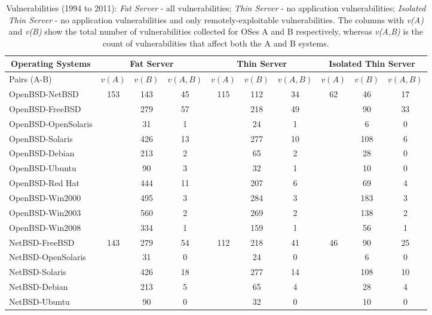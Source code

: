 \begin{table*}[!ht]
\caption{Vulnerabilities (1994 to 2011): \emph{Fat Server} - all vulnerabilities; \emph{Thin Server} - no application vulnerabilities; \emph{Isolated Thin Server} - no application vulnerabilities and only remotely-exploitable vulnerabilities. The columns with \textit{v(A)} and \textit{v(B)} show the total number of vulnerabilities collected for OSes A and B respectively, whereas \textit{v(A,B)} is the count of vulnerabilities that affect both the A and B systems.}
\label{tab:vulns}
\begin{center}
{\scriptsize
\begin{tabular}{|l|| c c c| c c c| c c c| }%

 \multicolumn{1}{c}{\textbf{Operating Systems}} &
 \multicolumn{3}{c}{\textbf{Fat Server}} &
 \multicolumn{3}{c}{\textbf{Thin Server}} &
 \multicolumn{3}{c}{\textbf{Isolated Thin Server}} \\
\hline
Pairs (A-B) & $\mathit{v}(A)$ & $\mathit{v}(B)$ & $\mathit{v}(A,B)$ & $\mathit{v}(A)$ & $\mathit{v}(B)$ & $\mathit{v}(A,B)$& $\mathit{v}(A)$ & $\mathit{v}(B)$ & $\mathit{v}(A,B)$\\\hline\hline
OpenBSD-NetBSD & 153 & 143 & 45 & 115 & 112 & 34 & 62 & 46 & 17\\
OpenBSD-FreeBSD & & 279 & 57 & & 218 & 49 & & 90 & 33\\
OpenBSD-OpenSolaris & & 31 & 1 & & 24 & 1 & & 6 & 0\\
OpenBSD-Solaris & & 426 & 13 & & 277 & 10 & & 108 & 6\\
OpenBSD-Debian & & 213 & 2 & & 65 & 2 & & 28 & 0\\
OpenBSD-Ubuntu & & 90 & 3 & & 32 & 1 & & 10 & 0\\
OpenBSD-Red Hat & & 444 & 11 & & 207 & 6 & & 69 & 4\\
OpenBSD-Win2000 & & 495 & 3 & & 284 & 3 & & 183 & 3\\
OpenBSD-Win2003 & & 560 & 2 & & 269 & 2 & & 138 & 2\\
OpenBSD-Win2008 & & 334 & 1 & & 159 & 1 & & 56 & 1\\ \hline
NetBSD-FreeBSD & 143 & 279 & 54 & 112 & 218 & 41 & 46 & 90 & 25\\
NetBSD-OpenSolaris & & 31 & 0 & & 24 & 0 & & 6 & 0\\
NetBSD-Solaris & & 426 & 18 & & 277 & 14 & & 108 & 10\\
NetBSD-Debian & & 213 & 5 & & 65 & 4 & & 28 & 4\\
NetBSD-Ubuntu & & 90 & 0 & & 32 & 0 & & 10 & 0\\

\end{tabular}}
\end{center}
\end{table*}
